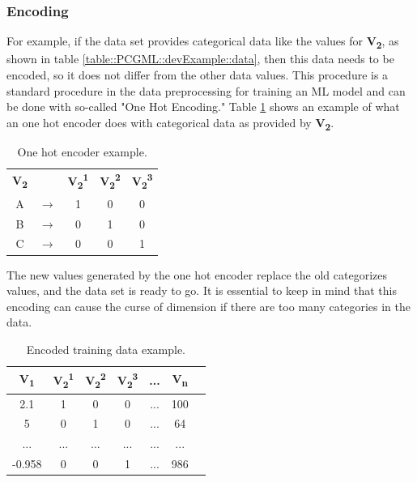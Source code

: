 \documentclass[MGS,Master,english]{twbook}%
\begin{document}
\subsubsection{Encoding}
For example, if the data set provides categorical data like the values for \textbf{V\textsubscript{2}}, as shown in table \ref{table::PCGML::devExample::data}, then this data needs to be encoded, so it does not differ from the other data values. This procedure is a standard procedure in the data preprocessing for training an ML model and can be done with so-called "One Hot Encoding." Table \ref{table::PCGML::devExample::oneHotEncoder} shows an example of what an one hot encoder does with categorical data as provided by \textbf{V\textsubscript{2}}. 
\begin{table}[!htbp]
	\centering
	\begin{tabular}{|c|c|c|c|c|}
		\cline{1-1} \cline{3-5}
		\textbf{V\textsubscript{2}} &  & \textbf{V\textsubscript{2}\textsuperscript{1}} & \textbf{V\textsubscript{2}\textsuperscript{2}} & \textbf{V\textsubscript{2}\textsuperscript{3}} \\ \hhline{=~===}
		A           & $\longrightarrow$         & 1           & 0           & 0           \\ \cline{1-1} \cline{3-5} 
		B           & $\longrightarrow$         & 0           & 1           & 0           \\ \cline{1-1} \cline{3-5} 
		C           & $\longrightarrow$         & 0           & 0           & 1           \\ \cline{1-1} \cline{3-5} 
	\end{tabular}
	\caption{One hot encoder example.}
	\label{table::PCGML::devExample::oneHotEncoder}
\end{table}
The new values generated by the one hot encoder replace the old categorizes values, and the data set is ready to go. It is essential to keep in mind that this encoding can cause the curse of dimension if there are too many categories in the data.
\begin{table}[!htbp]
	\centering
	\begin{tabular}{|c|c|c|c|c|c|c|}
		\hline
		\textbf{V\textsubscript{1}} & \textbf{V\textsubscript{2}\textsuperscript{1}}& \textbf{V\textsubscript{2}\textsuperscript{2}}& \textbf{V\textsubscript{2}\textsuperscript{3}} & \textbf{...} & \textbf{V\textsubscript{n}} \\ \hline\hline
		2.1         & 1   & 0   & 0       & ...          & 100         \\ \hline
		5           & 0   & 1   & 0       & ...          & 64          \\ \hline
		...         & ... & ... & ...     & ...          & ...         \\ \hline
		-0.958      & 0   & 0   & 1       & ...          & 986         \\ \hline
	\end{tabular}
	\caption{Encoded training data example.}
	\label{table::PCGML::devExample::data_encoded}
\end{table}
\end{document}
